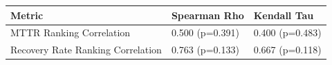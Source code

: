 \begin{tabular}{lll}
\toprule
Metric & Spearman Rho & Kendall Tau \\
\midrule
MTTR Ranking Correlation & 0.500 (p=0.391) & 0.400 (p=0.483) \\
Recovery Rate Ranking Correlation & 0.763 (p=0.133) & 0.667 (p=0.118) \\
\bottomrule
\end{tabular}
